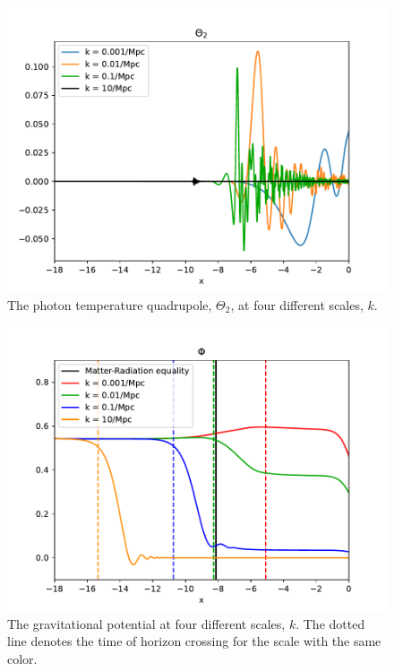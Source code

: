\documentclass{aa}
\begin{document}
\begin{figure}[H]
   \includegraphics[scale=0.65]{../figures/milestone3/theta_2.pdf}
   \caption{The photon temperature quadrupole, $\Theta_2$, at four different scales, $k$.}\label{fig:theta2}
\end{figure}

\begin{figure}[H]
   \includegraphics[scale=0.6]{../figures/milestone3/phi.pdf}
   \caption{The gravitational potential at four different scales, $k$. The dotted line denotes the time of horizon crossing for the scale with the same color.}\label{fig:phi}
\end{figure}
\end{document}
